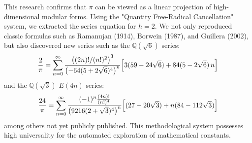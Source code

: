 \documentclass[11pt,a4paper]{article}
\begin{document}
This research confirms that $\pi$ can be viewed as a linear projection of high-dimensional modular forms. Using the "Quantity Free-Radical Cancellation" system, we extracted the series equation for $h=2$. We not only reproduced classic formulas such as Ramanujan (1914), Borwein (1987), and Guillera (2002), but also discovered new series such as the $\mathbb{Q}(\sqrt{6})$ series:
\begin{equation}
\frac{2}{\pi} = \sum_{n=0}^{\infty} \frac{\bigl((2n)!/(n!)^2\bigr)^3}{\bigl(-64(5+2\sqrt{6})^4\bigr)^n} \Bigl[ 3(59 - 24\sqrt{6}) + 84(5 - 2\sqrt{6})\,n \Bigr]
\end{equation}
and the $\mathbb{Q}(\sqrt{3})$ $E(4n)$ series:
\begin{equation}
\frac{24}{\pi} = \sum_{n=0}^{\infty} \frac{(-1)^n \frac{(4n)!}{(n!)^4}}{\bigl(9216(2+\sqrt{3})^4\bigr)^n} \Bigl[ (27 - 20\sqrt{3}) + n(84 - 112\sqrt{3}) \Bigr]
\end{equation}
among others not yet publicly published. This methodological system possesses high universality for the automated exploration of mathematical constants.
\end{document}
